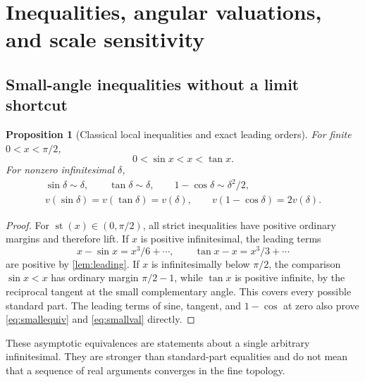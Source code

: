 \documentclass[11pt,letterpaper]{article}
\newtheorem{proposition}[theorem]{Proposition}
\theoremstyle{definition}
\theoremstyle{remark}
\newcommand{\st}{\operatorname{st}}
\numberwithin{equation}{section}
\begin{document}
\section{Inequalities, angular valuations, and scale sensitivity}\label{sec:valuation}
\subsection{Small-angle inequalities without a limit shortcut}
\begin{proposition}[Classical local inequalities and exact leading orders]\label{prop:smallangles}
For finite $0<x<\pi/2$,
\begin{equation}\label{eq:smallineq}
 0<\sin x<x<\tan x.
\end{equation}
For nonzero infinitesimal $\delta$,
\begin{gather}\label{eq:smallequiv}
 \sin\delta\sim\delta,\qquad \tan\delta\sim\delta,\qquad
 1-\cos\delta\sim\delta^2/2,\\
 v(\sin\delta)=v(\tan\delta)=v(\delta),\qquad
 v(1-\cos\delta)=2v(\delta).\label{eq:smallval}
\end{gather}
\end{proposition}
\begin{proof}
For $\st(x)\in(0,\pi/2)$, all strict inequalities have positive ordinary margins and therefore lift. If $x$ is positive infinitesimal, the leading terms
\[
 x-\sin x=x^3/6+\cdots,\qquad \tan x-x=x^3/3+\cdots
\]
are positive by \cref{lem:leading}. If $x$ is infinitesimally below $\pi/2$, the comparison $\sin x<x$ has ordinary margin $\pi/2-1$, while $\tan x$ is positive infinite, by the reciprocal tangent at the small complementary angle. This covers every possible standard part. The leading terms of sine, tangent, and $1-\cos$ at zero also prove \eqref{eq:smallequiv} and \eqref{eq:smallval} directly.
\end{proof}
These asymptotic equivalences are statements about a single arbitrary infinitesimal. They are stronger than standard-part equalities and do not mean that a sequence of real arguments converges in the fine topology.
\end{document}
